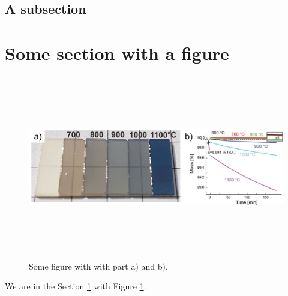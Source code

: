 \subsection{A subsection}

\lipsum[12]

\section{Some section with a figure} \label{section-with-figure}

\lipsum[15-16]
\begin{figure} [!h]
	\centering
	\includegraphics[width=14cm,height=8cm,keepaspectratio]{figures/introduction/annealing-intro}
	\setlength\belowcaptionskip{3pt}
	\caption{Some figure with with part a) and b).}
	\label{some-figure}
\end{figure}


We are in the Section \ref{section-with-figure} with Figure \ref{some-figure}.


\lipsum[19-20]






